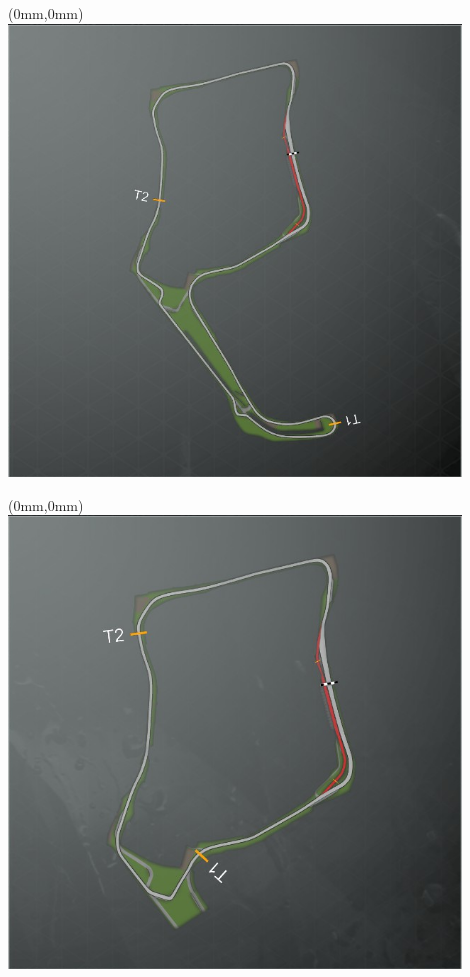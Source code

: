 \null\newpage
\begin{textblock*}{30mm}(0mm,0mm)%
\includegraphics[width=120mm]{TR/2015-05-20_00048.png}
\end{textblock*}
\null\newpage
\begin{textblock*}{30mm}(0mm,0mm)%
\includegraphics[width=120mm]{TR/2015-05-20_00050.png}
\end{textblock*}
